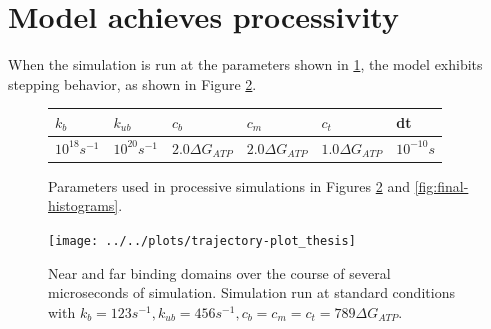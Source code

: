 \documentclass[
11pt, %
english, %
singlespacing, %
headsepline, %
chapterinoneline, %
]{MastersDoctoralThesis} %
\begin{document}

\section{Model achieves processivity}
When the simulation is run at the parameters shown in \ref{table:thesis-parameters}, the model exhibits stepping behavior, as shown in Figure \ref{fig:stepping-trajectory}.\\

\begin{figure}[h]
  \centering
  \begin{tabular}{| l | l | l | l | l | l |}
    \hline
    $k_{b}$ & $k_{ub}$ & $c_b$ &  $c_m$ & $c_t$ & dt\\\hline
    $10^{18} s^{-1}$ & $10^{20} s^{-1}$ & $2.0\Delta G_{ATP}$ & $2.0\Delta G_{ATP}$ & $1.0\Delta G_{ATP}$ & $10^{-10}s$\\ \hline
  \end{tabular}
  \caption{Parameters used in processive simulations in Figures \ref{fig:stepping-trajectory} and \ref{fig:final-histograms}.}
  \label{table:thesis-parameters}
\end{figure}

\begin{figure}[H]
  \centering
  \texttt{[image: ../../plots/trajectory-plot\_thesis]}
  \caption{Near and far binding domains over the course of several microseconds of simulation. Simulation run at standard conditions with $k_b=123 s^{-1}, k_{ub}=456 s^{-1}, c_b=c_m=c_t=789 \Delta G_{ATP}$.}
  \label{fig:stepping-trajectory}
\end{figure}
\end{document}
